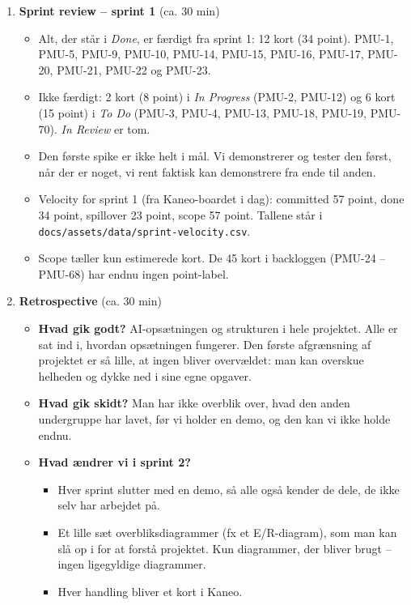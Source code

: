 \documentclass[a4paper,11pt]{article}
\begin{document}
\begin{enumerate}
    \item \textbf{Sprint review -- sprint 1} (ca. 30 min)
    \begin{itemize}
        \item Alt, der står i \emph{Done}, er færdigt fra sprint 1: 12 kort (34 point). PMU-1, PMU-5, PMU-9, PMU-10, PMU-14, PMU-15, PMU-16, PMU-17, PMU-20, PMU-21, PMU-22 og PMU-23.
        \item Ikke færdigt: 2 kort (8 point) i \emph{In Progress} (PMU-2, PMU-12) og 6 kort (15 point) i \emph{To Do} (PMU-3, PMU-4, PMU-13, PMU-18, PMU-19, PMU-70). \emph{In Review} er tom.
        \item Den første spike er ikke helt i mål. Vi demonstrerer og tester den først, når der er noget, vi rent faktisk kan demonstrere fra ende til anden.
        \item Velocity for sprint 1 (fra Kaneo-boardet i dag): committed 57 point, done 34 point, spillover 23 point, scope 57 point. Tallene står i \texttt{docs/assets/data/sprint-velocity.csv}.
        \item Scope tæller kun estimerede kort. De 45 kort i backloggen (PMU-24 -- PMU-68) har endnu ingen point-label.
    \end{itemize}
    \item \textbf{Retrospective} (ca. 30 min)
    \begin{itemize}
        \item \textbf{Hvad gik godt?} AI-opsætningen og strukturen i hele projektet. Alle er sat ind i, hvordan opsætningen fungerer. Den første afgrænsning af projektet er så lille, at ingen bliver overvældet: man kan overskue helheden og dykke ned i sine egne opgaver.
        \item \textbf{Hvad gik skidt?} Man har ikke overblik over, hvad den anden undergruppe har lavet, før vi holder en demo, og den kan vi ikke holde endnu.
        \item \textbf{Hvad ændrer vi i sprint 2?}
        \begin{itemize}
            \item Hver sprint slutter med en demo, så alle også kender de dele, de ikke selv har arbejdet på.
            \item Et lille sæt overbliksdiagrammer (fx et E/R-diagram), som man kan slå op i for at forstå projektet. Kun diagrammer, der bliver brugt -- ingen ligegyldige diagrammer.
            \item Hver handling bliver et kort i Kaneo.

\end{itemize}
\end{itemize}
\end{enumerate}
\end{document}
